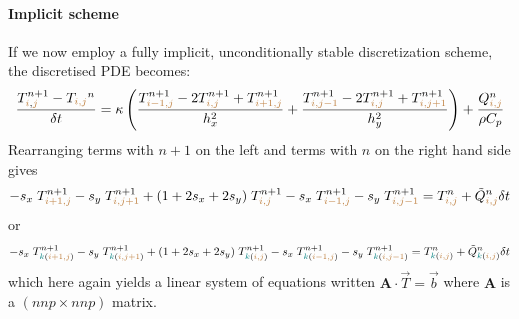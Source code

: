 \paragraph{Implicit scheme} 
If we now employ a fully implicit, unconditionally stable discretization scheme, the discretised 
PDE becomes:
\begin{equation}
\frac{T_{{\color{brown}i},{\color{brown}j}}^{n+1}-T_{\color{brown}i,j}^n}{\delta t}
= \kappa
\left(
\frac{ T_{{\color{brown}i-1,j}}^{n+1}-2T_{{\color{brown}i,j}}^{n+1}+T_{{\color{brown}i+1,j}}^{n+1} }{h_x^2} + 
\frac{ T_{{\color{brown}i,j-1}}^{n+1}-2T_{{\color{brown}i,j}}^{n+1}+T_{{\color{brown}i,j+1}}^{n+1} }{h_y^2}
\right)
+\frac{Q_{{\color{brown}i,j}}^n}{\rho C_p}
\end{equation}
Rearranging terms with $n+1$ on the left and terms with $n$ on the right hand side gives
\begin{equation}
-s_x\; T_{{\color{brown}i+1,j}}^{n+1}
-s_y\; T_{{\color{brown}i,j+1}}^{n+1} 
+(1+2s_x+2s_y)\; T_{{\color{brown}i,j}}^{n+1} 
-s_x\;  T_{{\color{brown}i-1,j}}^{n+1} 
-s_y\;  T_{{\color{brown}i,j-1}}^{n+1} 
=
T_{{\color{brown}i,j}}^n
+\tilde{Q}_{{\color{brown}i,j}}^n \delta t
\end{equation}
or
\begin{equation}
-s_x\;           T_{{\color{teal}k}({\color{brown}i+1,j})}^{n+1}
-s_y\;           T_{{\color{teal}k}({\color{brown}i,j+1})}^{n+1} 
+(1+2s_x+2s_y)\; T_{{\color{teal}k}({\color{brown}i,j}  )}^{n+1} 
-s_x\;           T_{{\color{teal}k}({\color{brown}i-1,j})}^{n+1} 
-s_y\;           T_{{\color{teal}k}({\color{brown}i,j-1})}^{n+1} 
=
T_{{\color{teal}k}({\color{brown}i,j})}^n
+\tilde{Q}_{{\color{teal}k}({\color{brown}i,j})}^n \delta t
\end{equation}
which here again yields a linear system of equations written ${\bm A}\cdot {\vec T} = {\vec b}$
where ${\bm A}$ is a $(nnp \times nnp)$ matrix.

